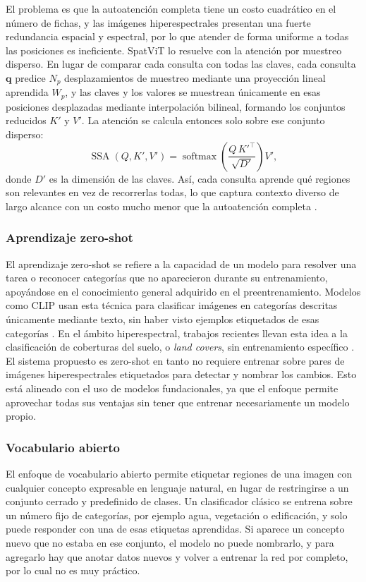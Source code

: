 \documentclass[12pt,onecolumn]{IEEEtran}
\begin{document}
El problema es que la autoatención completa tiene un costo cuadrático en el número de fichas, y las imágenes hiperespectrales presentan una fuerte redundancia espacial y espectral, por lo que atender de forma uniforme a todas las posiciones es ineficiente. SpatViT lo resuelve con la atención por muestreo disperso. En lugar de comparar cada consulta con todas las claves, cada consulta $\mathbf{q}$ predice $N_p$ desplazamientos de muestreo mediante una proyección lineal aprendida $W_p$, y las claves y los valores se muestrean únicamente en esas posiciones desplazadas mediante interpolación bilineal, formando los conjuntos reducidos $K'$ y $V'$. La atención se calcula entonces solo sobre ese conjunto disperso:
\begin{equation}
\operatorname{SSA}(Q,K',V')=\operatorname{softmax}\!\left(\frac{Q\,K'^{\top}}{\sqrt{D'}}\right)V',
\end{equation}
donde $D'$ es la dimensión de las claves. Así, cada consulta aprende qué regiones son relevantes en vez de recorrerlas todas, lo que captura contexto diverso de largo alcance con un costo mucho menor que la autoatención completa \cite{wang2024hypersigma}.

\subsubsection{Aprendizaje zero-shot}
El aprendizaje zero-shot se refiere a la capacidad de un modelo para resolver una tarea o reconocer categorías que no aparecieron durante su entrenamiento, apoyándose en el conocimiento general adquirido en el preentrenamiento. Modelos como CLIP usan esta técnica para clasificar imágenes en categorías descritas únicamente mediante texto, sin haber visto ejemplos etiquetados de esas categorías \cite{radford2021clip}. En el ámbito hiperespectral, trabajos recientes llevan esta idea a la clasificación de coberturas del suelo, o \textit{land covers}, sin entrenamiento específico \cite{pang2025special}. El sistema propuesto es zero-shot en tanto no requiere entrenar sobre pares de imágenes hiperespectrales etiquetados para detectar y nombrar los cambios. Esto está alineado con el uso de modelos fundacionales, ya que el enfoque permite aprovechar todas sus ventajas sin tener que entrenar necesariamente un modelo propio.

\subsubsection{Vocabulario abierto}
El enfoque de vocabulario abierto permite etiquetar regiones de una imagen con cualquier concepto expresable en lenguaje natural, en lugar de restringirse a un conjunto cerrado y predefinido de clases. Un clasificador clásico se entrena sobre un número fijo de categorías, por ejemplo agua, vegetación o edificación, y solo puede responder con una de esas etiquetas aprendidas. Si aparece un concepto nuevo que no estaba en ese conjunto, el modelo no puede nombrarlo, y para agregarlo hay que anotar datos nuevos y volver a entrenar la red por completo, por lo cual no es muy práctico.
\end{document}
